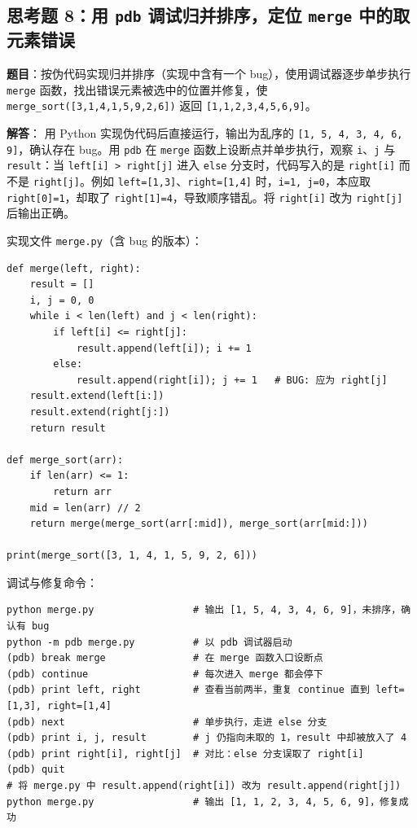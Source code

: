 \documentclass[12pt,a4paper]{article}
\begin{document}
\subsection{思考题 8：用 \texttt{pdb} 调试归并排序，定位 \texttt{merge} 中的取元素错误}
\textbf{题目}：按伪代码实现归并排序（实现中含有一个 bug），使用调试器逐步单步执行 \texttt{merge} 函数，找出错误元素被选中的位置并修复，使 \texttt{merge\_sort([3,1,4,1,5,9,2,6])} 返回 \texttt{[1,1,2,3,4,5,6,9]}。

\textbf{解答}：
用 Python 实现伪代码后直接运行，输出为乱序的 \texttt{[1, 5, 4, 3, 4, 6, 9]}，确认存在 bug。用 \texttt{pdb} 在 \texttt{merge} 函数上设断点并单步执行，观察 \texttt{i}、\texttt{j} 与 \texttt{result}：当 \texttt{left[i] > right[j]} 进入 \texttt{else} 分支时，代码写入的是 \texttt{right[i]} 而不是 \texttt{right[j]}。例如 \texttt{left=[1,3]}、\texttt{right=[1,4]} 时，\texttt{i=1, j=0}，本应取 \texttt{right[0]=1}，却取了 \texttt{right[1]=4}，导致顺序错乱。将 \texttt{right[i]} 改为 \texttt{right[j]} 后输出正确。

实现文件 \texttt{merge.py}（含 bug 的版本）：
\begin{lstlisting}
def merge(left, right):
    result = []
    i, j = 0, 0
    while i < len(left) and j < len(right):
        if left[i] <= right[j]:
            result.append(left[i]); i += 1
        else:
            result.append(right[i]); j += 1   # BUG: 应为 right[j]
    result.extend(left[i:])
    result.extend(right[j:])
    return result

def merge_sort(arr):
    if len(arr) <= 1:
        return arr
    mid = len(arr) // 2
    return merge(merge_sort(arr[:mid]), merge_sort(arr[mid:]))

print(merge_sort([3, 1, 4, 1, 5, 9, 2, 6]))
\end{lstlisting}

调试与修复命令：
\begin{lstlisting}
python merge.py                 # 输出 [1, 5, 4, 3, 4, 6, 9]，未排序，确认有 bug
python -m pdb merge.py          # 以 pdb 调试器启动
(pdb) break merge               # 在 merge 函数入口设断点
(pdb) continue                  # 每次进入 merge 都会停下
(pdb) print left, right         # 查看当前两半，重复 continue 直到 left=[1,3], right=[1,4]
(pdb) next                      # 单步执行，走进 else 分支
(pdb) print i, j, result        # j 仍指向未取的 1，result 中却被放入了 4
(pdb) print right[i], right[j]  # 对比：else 分支误取了 right[i]
(pdb) quit
# 将 merge.py 中 result.append(right[i]) 改为 result.append(right[j])
python merge.py                 # 输出 [1, 1, 2, 3, 4, 5, 6, 9]，修复成功
\end{lstlisting}
\end{document}
